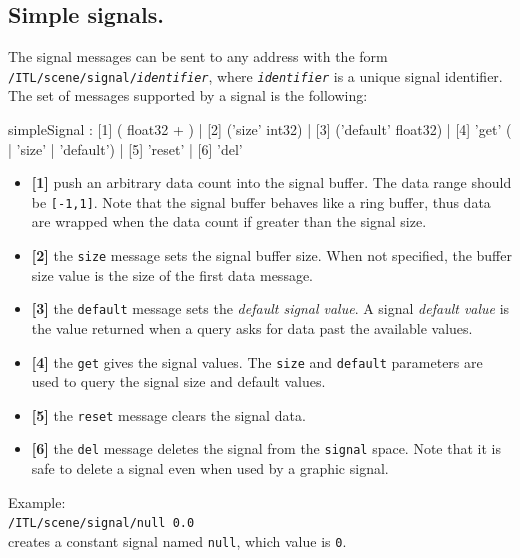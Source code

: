 \documentclass[a4paper,twoside]{report}
\newcommand{\subsublevel}[1]	{\subsection{#1}}
\newcommand{\OSC}[1]		{\texttt{#1}}
\newcommand{\values}[1]	{\texttt{#1}}
\newcommand{\example}		{\hspace*{1cm}}
\begin{document}
\subsublevel{Simple signals.}
\label{ssignal}
The signal messages can be sent to any address with the form \OSC{/ITL/scene/signal/\textit{identifier}}, where \OSC{\textit{identifier}} is a unique signal identifier.
The set of messages supported by a signal is the following:
\begin{rail}
simpleSignal : [1] ( float32 + )
		| [2] ('size' int32) 
		| [3] ('default' float32)
		| [4] 'get' ( | 'size' | 'default')
		| [5] 'reset'
		| [6] 'del'
\end{rail}

\begin{itemize}
\item \textbf{[1]} push an arbitrary data count into the signal buffer. The data range should be \values{[-1,1]}. Note that the signal buffer behaves like a ring buffer, thus data are wrapped when the data count if greater than the signal size. 
\item \textbf{[2]} the \OSC{size} message sets the signal buffer size. When not specified, the buffer size value is the size of the first data message. 
\item \textbf{[3]} the \OSC{default} message sets the \emph{default signal value}. A signal \emph{default value} is the value returned when a query asks for data past the available values.
\item \textbf{[4]} the \OSC{get} gives the signal values. The \OSC{size} and  \OSC{default} parameters are used to query the signal size and default values.
\item \textbf{[5]} the \OSC{reset} message clears the signal data. 
\item \textbf{[6]} the \OSC{del} message deletes the signal from the \OSC{signal} space. Note that it is safe to delete a signal even when used by a graphic signal. 
\end{itemize}

Example:\\
\example \OSC{/ITL/scene/signal/null 0.0}\\
creates a constant signal named \OSC{null}, which value is \values{0}.
\end{document}
